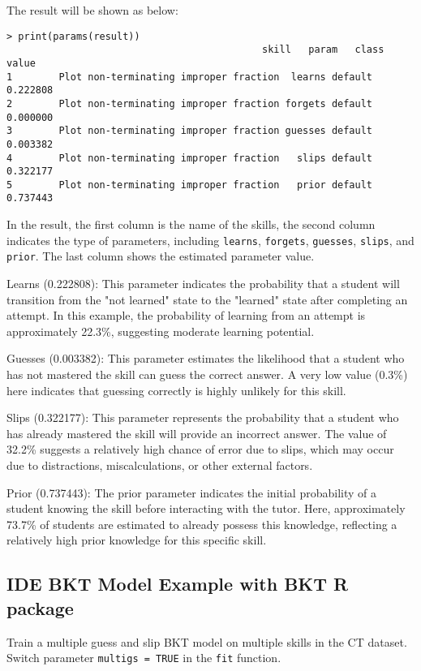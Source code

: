 \documentclass{article}
\begin{document}
The result will be shown as below: 

\begin{verbatim}
> print(params(result))
                                            skill   param   class    value
1        Plot non-terminating improper fraction  learns default 0.222808
2        Plot non-terminating improper fraction forgets default 0.000000
3        Plot non-terminating improper fraction guesses default 0.003382
4        Plot non-terminating improper fraction   slips default 0.322177
5        Plot non-terminating improper fraction   prior default 0.737443
\end{verbatim}

In the result, the first column is the name of the skills, the second column indicates the type of parameters, including \texttt{learns}, \texttt{forgets}, \texttt{guesses}, \texttt{slips}, and \texttt{prior}. The last column shows the estimated parameter value.

Learns (0.222808): This parameter indicates the probability that a student will transition from the "not learned" state to the "learned" state after completing an attempt. In this example, the probability of learning from an attempt is approximately 22.3\%, suggesting moderate learning potential.

Guesses (0.003382): This parameter estimates the likelihood that a student who has not mastered the skill can guess the correct answer. A very low value (0.3\%) here indicates that guessing correctly is highly unlikely for this skill.

Slips (0.322177): This parameter represents the probability that a student who has already mastered the skill will provide an incorrect answer. The value of 32.2\% suggests a relatively high chance of error due to slips, which may occur due to distractions, miscalculations, or other external factors.

Prior (0.737443): The prior parameter indicates the initial probability of a student knowing the skill before interacting with the tutor. Here, approximately 73.7\% of students are estimated to already possess this knowledge, reflecting a relatively high prior knowledge for this specific skill.

\subsection{IDE BKT Model Example with BKT R package}

Train a multiple guess and slip BKT model on multiple skills in the CT dataset. Switch parameter \texttt{multigs = TRUE} in the \texttt{fit} function.
\end{document}
